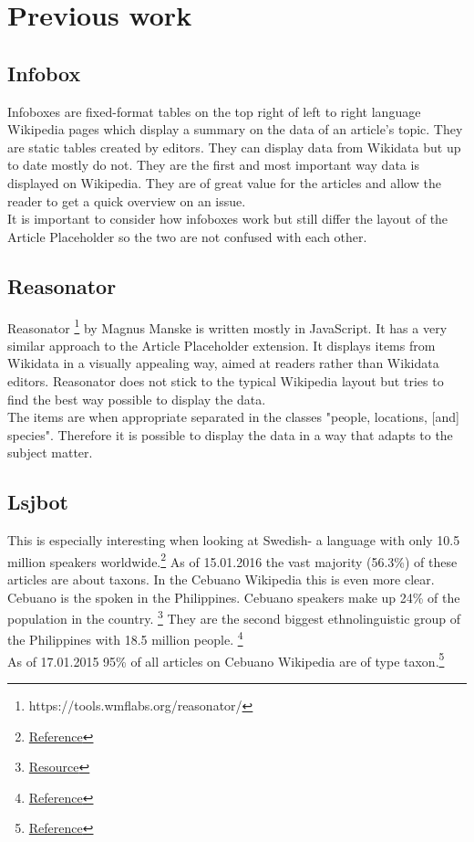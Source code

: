 \section{Previous work}
\subsection{Infobox}
Infoboxes are fixed-format tables on the top right of left to right language Wikipedia pages which display a summary on the data of an article's topic. They are static tables created by editors. They can display data from Wikidata but up to date mostly do not. They are the first and most important way data is displayed on Wikipedia. They are of great value for the articles and allow the reader to get a quick overview on an issue. \\
It is important to consider how infoboxes work but still differ the layout of the Article Placeholder so the two are not confused with each other.

\subsection{Reasonator}
Reasonator \footnote{https://tools.wmflabs.org/reasonator/} by Magnus Manske is written mostly in JavaScript. It has a very similar approach to the Article Placeholder extension. It displays items from Wikidata in a visually appealing way, aimed at readers rather than Wikidata editors. Reasonator does not stick to the typical Wikipedia layout but tries to find the best way possible to display the data. \\
The items are when appropriate separated in the classes   "people, locations, [and] species". Therefore it is possible to display the data in a way that adapts to the subject matter. \\

\subsection{Lsjbot}
This is especially interesting when looking at Swedish- a language with only 10.5 million speakers worldwide.\footnote{\href{http://www.npld.eu/about-us/swedish/}{Reference}} As of 15.01.2016 the vast majority (56.3\%) of these articles are about taxons. In the Cebuano Wikipedia this is even more clear. Cebuano is the spoken in the Philippines. Cebuano speakers make up 24\% of the population in the country. \footnote{\href{https://terpconnect.umd.edu/~oard/pdf/hlt03.pdf}{Resource}} They are the second biggest ethnolinguistic group of the Philippines with 18.5 million people. \footnote{\href{http://www.britannica.com/topic/Cebuano-language}{Reference}} \\
As of 17.01.2015 95\% of all articles on Cebuano Wikipedia are of type taxon.\footnote{\href{https://www.wikidata.org/wiki/Wikidata:Statistics/Wikipedia}{Reference}} 
\\

